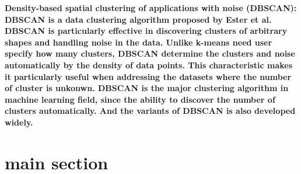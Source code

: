 \documentclass[twocolumn,10pt]{article}
\begin{document}
\bf{Density-based spatial clustering of applications with noise (DBSCAN)}: \rm{DBSCAN} is a data clustering algorithm proposed by
Ester et al. \cite{10.5555/3001460.3001507} DBSCAN is particularly effective in discovering clusters of arbitrary shapes and 
handling noise in the data. Unlike k-means need user specify how many clusters, DBSCAN determine the clusters and noise 
automatically by the density of data points. This characteristic makes it particularly useful when addressing the datasets 
where the number of cluster is unkonwn. DBSCAN is the major clustering algorithm in machine learning field, since the ability to 
discover the number of clusters automatically. And the variants of DBSCAN \cite{6814687} is also developed widely. 

\section{main section}
\end{document}
